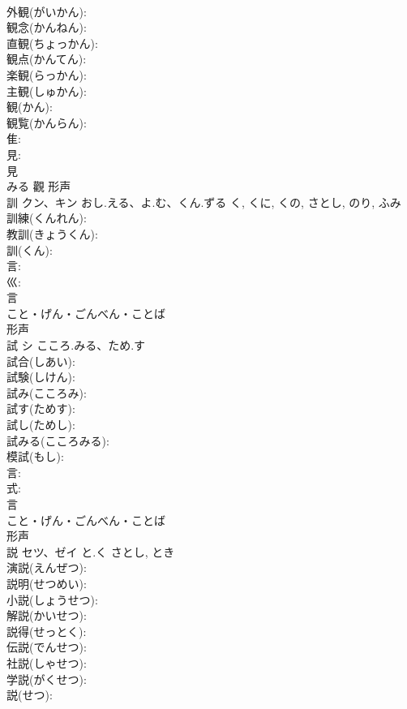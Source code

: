 \documentclass[8pt]{extreport}
\begin{document}
\begin{CJK}{UTF8}{min}
\\	外観(がいかん): 
\\	観念(かんねん): 
\\	直観(ちょっかん): 
\\	観点(かんてん): 
\\	楽観(らっかん): 
\\	主観(しゅかん): 
\\	観(かん): 
\\	観覧(かんらん): 
\\	隹: 
\\	見: 
\\	見	
\\	みる	觀	形声 
\\	訓	クン、キン	おし.える、よ.む、くん.ずる	く, くに, くの, さとし, のり, ふみ	
\\	訓練(くんれん): 
\\	教訓(きょうくん): 
\\	訓(くん): 
\\	言: 
\\	巛: 
\\	言	
\\	こと・げん・ごんべん・ことば	
\\	形声 
\\	試	シ	こころ.みる、ため.す		
\\	試合(しあい): 
\\	試験(しけん): 
\\	試み(こころみ): 
\\	試す(ためす): 
\\	試し(ためし): 
\\	試みる(こころみる): 
\\	模試(もし): 
\\	言: 
\\	式: 
\\	言	
\\	こと・げん・ごんべん・ことば	
\\	形声 
\\	説	セツ、ゼイ	と.く	さとし, とき	
\\	演説(えんぜつ): 
\\	説明(せつめい): 
\\	小説(しょうせつ): 
\\	解説(かいせつ): 
\\	説得(せっとく): 
\\	伝説(でんせつ): 
\\	社説(しゃせつ): 
\\	学説(がくせつ): 
\\	説(せつ): 

\end{CJK}
\end{document}
